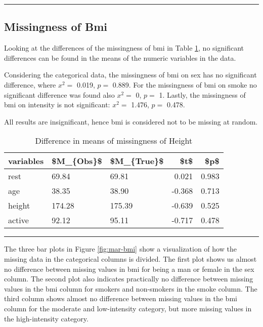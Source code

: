 \documentclass[
]{article}
\begin{document}
\begin{center}\rule{0.5\linewidth}{0.5pt}\end{center}

\hypertarget{missB}{%
\subsection{Missingness of Bmi}\label{missB}}

Looking at the differences of the missingness of bmi in Table \ref{tab:missB}, no significant differences can be found in the means of the numeric variables in the data.

Considering the categorical data, the missingness of bmi on sex has no significant difference, where \(x^2 =\) 0.019, \(p =\) 0.889. For the missingness of bmi on smoke no significant difference was found also \(x^2 =\) 0, \(p =\) 1. Lastly, the missingness of bmi on intensity is not significant: \(x^2 =\) 1.476, \(p =\) 0.478.

All results are insignificant, hence bmi is considered not to be missing at random.

\begin{table}

\caption{\label{tab:missB}Difference in means of missingness of Height}
\centering
\begin{tabular}[t]{l|l|l|r|r}
\hline
variables & \$M\_\{Obs\}\$ & \$M\_\{True\}\$ & \$t\$ & \$p\$\\
\hline
rest & 69.84 & 69.81 & 0.021 & 0.983\\
\hline
age & 38.35 & 38.90 & -0.368 & 0.713\\
\hline
height & 174.28 & 175.39 & -0.639 & 0.525\\
\hline
active & 92.12 & 95.11 & -0.717 & 0.478\\
\hline
\end{tabular}
\end{table}

\begin{center}\rule{0.5\linewidth}{0.5pt}\end{center}

The three bar plots in Figure \ref{fig:mar-bmi} show a visualization of how the missing data in the categorical columns is divided. The first plot shows us almost no difference between missing values in bmi for being a man or female in the sex column. The second plot also indicates practically no difference between missing values in the bmi column for smokers and non-smokers in the smoke column. The third column shows almost no difference between missing values in the bmi column for the moderate and low-intensity category, but more missing values in the high-intensity category.
\end{document}
